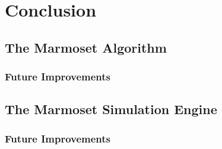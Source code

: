 \documentclass[ %
                    author={Alexander Hill},
                supervisor={Dr. Benjamin Sach},
                    degree={MEng},
                     title={MARMOSET},
                  subtitle={Multi-Agent Route Management using Online Simulation for Efficient Transportation},
                      type={research},
                      year={2016} ]{dissertation}
\begin{document}


\chapter{Conclusion}
\label{chap:conclusion}

\section{The Marmoset Algorithm}

\subsection{Future Improvements}

\section{The Marmoset Simulation Engine}

\subsection{Future Improvements}


\end{document}
